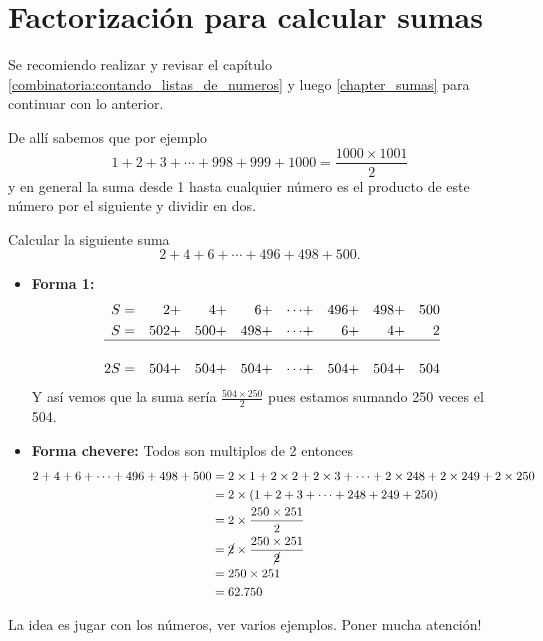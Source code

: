 \section{Factorización para calcular sumas }\label{section_fact_para_calc_sumas}

\begin{tcolorbox}[colback=white!5!white,colframe=green!50!black]
Se recomiendo realizar y revisar el capítulo \ref{combinatoria:contando_listas_de_numeros} y luego \ref{chapter_sumas} para continuar con lo anterior.
\end{tcolorbox}

De allí sabemos que por ejemplo 
\[
1+2+3 +\cdots + 998+999+1000 = \frac{1000\times 1001}{2}
\]
y en general la suma desde 1 hasta cualquier número es el producto de este número por el siguiente y dividir en dos.

\begin{ejemplo}
Calcular la siguiente suma
\[
2+4+6+\cdots +496+498+500.
\]
\begin{itemize}
	\item \textbf{Forma 1:} 
			\begin{align*}
			S&= &2&+&4&+&6&+&\cdots &+ &496&+&498&+&500\\
			S&= &502&+&500&+&498&+&\cdots&+& 6&+&4&+&2\\
			\hline\\
			2S&= &504 &+ &504 &+ &504 &+ &\cdots&+ &504 &+ &504 &+ &504
			\end{align*}
			Y así vemos que la suma sería $\frac{504\times 250}{2}$ pues estamos sumando 250 veces el 504. 
	\item \textbf{Forma chevere:} Todos son multiplos de 2 entonces 
			\begin{align*}
			2+4+6+\cdots +496+498+500 &= 2\times 1+2\times 2+2\times 3+\cdots +2\times 248+2\times 249+2\times 250 \\
			&=2\times (1+2+3+\cdots+248+249+250)\\
			&=2\times \frac{250\times 251}{2} \\			
			&= \cancel{2}\times \frac{250\times 251}{\cancel{2}}\\
			&= 250\times 251\\
			&= 62.750
			\end{align*}
\end{itemize}
\end{ejemplo}

La idea es jugar con los números, ver varios ejemplos. Poner mucha atención!

